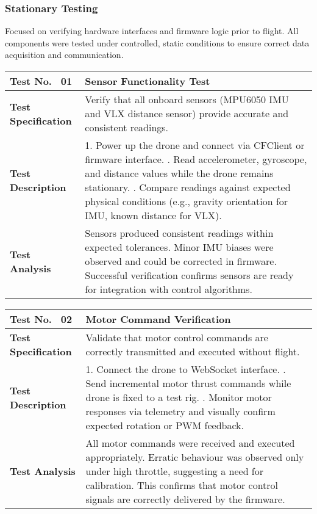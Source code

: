 \subsubsection{Stationary Testing} \leavevmode

Focused on verifying hardware interfaces and firmware logic prior to flight. All components were tested under controlled, static conditions to ensure correct data acquisition and communication.

\begin{table}[H]
\centering
\renewcommand{\arraystretch}{1.2}
\begin{tabular}{|p{3.5cm}|p{12cm}|}
\hline
\textbf{Test No. \, 01} & \textbf{Sensor Functionality Test} \\ \hline
\textbf{Test Specification} & 
Verify that all onboard sensors (MPU6050 IMU and VLX distance sensor) provide accurate and consistent readings. \\ \hline
\textbf{Test Description} & 
1. Power up the drone and connect via CFClient or firmware interface. \newline
2. Read accelerometer, gyroscope, and distance values while the drone remains stationary. \newline
3. Compare readings against expected physical conditions (e.g., gravity orientation for IMU, known distance for VLX). \\ \hline
\textbf{Test Analysis} & 
Sensors produced consistent readings within expected tolerances. Minor IMU biases were observed and could be corrected in firmware. Successful verification confirms sensors are ready for integration with control algorithms. \\ \hline
\end{tabular}
\end{table}

\begin{table}[H]
\centering
\renewcommand{\arraystretch}{1.2}
\begin{tabular}{|p{3.5cm}|p{12cm}|}
\hline
\textbf{Test No. \, 02} & \textbf{Motor Command Verification} \\ \hline
\textbf{Test Specification} & 
Validate that motor control commands are correctly transmitted and executed without flight. \\ \hline
\textbf{Test Description} & 
1. Connect the drone to WebSocket interface. \newline
2. Send incremental motor thrust commands while drone is fixed to a test rig. \newline
3. Monitor motor responses via telemetry and visually confirm expected rotation or PWM feedback. \\ \hline
\textbf{Test Analysis} & 
All motor commands were received and executed appropriately. Erratic behaviour was observed only under high throttle, suggesting a need for calibration. This confirms that motor control signals are correctly delivered by the firmware. \\ \hline
\end{tabular}
\end{table}

